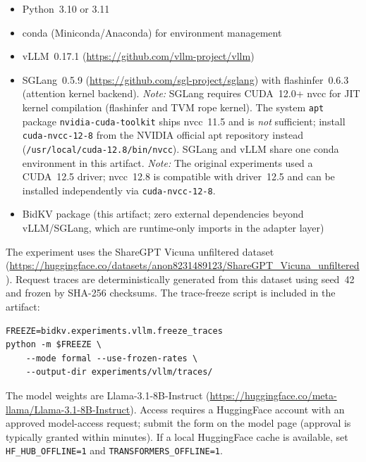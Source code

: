 \documentclass[conference]{IEEEtran}
\begin{document}

\begin{itemize}
  \item Python~3.10 or 3.11
  \item conda (Miniconda/Anaconda) for environment management
  \item vLLM~0.17.1 (\url{https://github.com/vllm-project/vllm})
  \item SGLang~0.5.9 (\url{https://github.com/sgl-project/sglang})
    with flashinfer~0.6.3 (attention kernel backend).
    \textit{Note:} SGLang requires CUDA~12.0+ nvcc for JIT kernel
    compilation (flashinfer and TVM rope kernel). The system
    \texttt{apt} package \texttt{nvidia-cuda-toolkit} ships nvcc~11.5
    and is \emph{not} sufficient; install \texttt{cuda-nvcc-12-8} from
    the NVIDIA official apt repository instead
    (\texttt{/usr/local/cuda-12.8/bin/nvcc}).
    SGLang and vLLM share one conda environment in this artifact.
    \textit{Note:} The original experiments used a CUDA~12.5 driver;
    nvcc~12.8 is compatible with driver~12.5 and can be installed
    independently via \texttt{cuda-nvcc-12-8}.
  \item BidKV package (this artifact; zero external dependencies beyond
    vLLM/SGLang, which are runtime-only imports in the adapter layer)
\end{itemize}


The experiment uses the ShareGPT Vicuna unfiltered dataset
(\url{https://huggingface.co/datasets/anon8231489123/ShareGPT_Vicuna_unfiltered}).
Request traces are deterministically generated from this dataset using
seed~42 and frozen by SHA-256 checksums.
The trace-freeze script is included in the artifact:

\begin{Verbatim}
FREEZE=bidkv.experiments.vllm.freeze_traces
python -m $FREEZE \
    --mode formal --use-frozen-rates \
    --output-dir experiments/vllm/traces/
\end{Verbatim}


The model weights are Llama-3.1-8B-Instruct
(\url{https://huggingface.co/meta-llama/Llama-3.1-8B-Instruct}).
Access requires a HuggingFace account with an approved model-access
request; submit the form on the model page (approval is typically
granted within minutes).
If a local HuggingFace cache is available, set
\texttt{HF\_HUB\_OFFLINE=1} and \texttt{TRANSFORMERS\_OFFLINE=1}.

\artinpart{Installation and Deployment}
\end{document}
